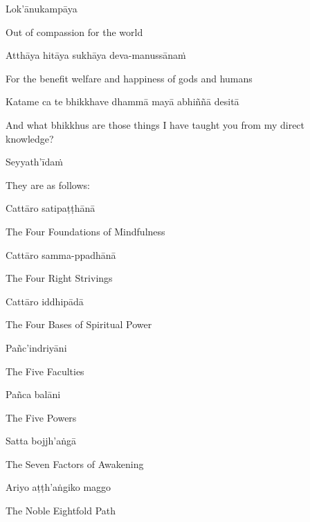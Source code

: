 Lok'ānukampāya

\begin{english}
  Out of compassion for the world
\end{english}

Atthāya hitāya sukhāya deva-manussānaṁ

\begin{english}
  For the benefit welfare and happiness of gods and humans
\end{english}

Katame ca te bhikkhave dhammā mayā abhiññā desitā

\begin{english-hang}
  And what bhikkhus are those things I have taught you from my direct knowledge?
\end{english-hang}

Seyyath'īdaṁ

\begin{english}
  They are as follows:
\end{english}

Cattāro satipaṭṭhānā

\begin{english}
  The Four Foundations of Mindfulness
\end{english}

Cattāro samma-ppadhānā

\begin{english}
  The Four Right Strivings
\end{english}

Cattāro iddhipādā

\begin{english}
  The Four Bases of Spiritual Power
\end{english}

Pañc'indriyāni

\begin{english}
  The Five Faculties
\end{english}

Pañca balāni

\begin{english}
  The Five Powers
\end{english}

Satta bojjh'aṅgā

\begin{english}
  The Seven Factors of Awakening
\end{english}

Ariyo aṭṭh'aṅgiko maggo

\begin{english}
  The Noble Eightfold Path
\end{english}

